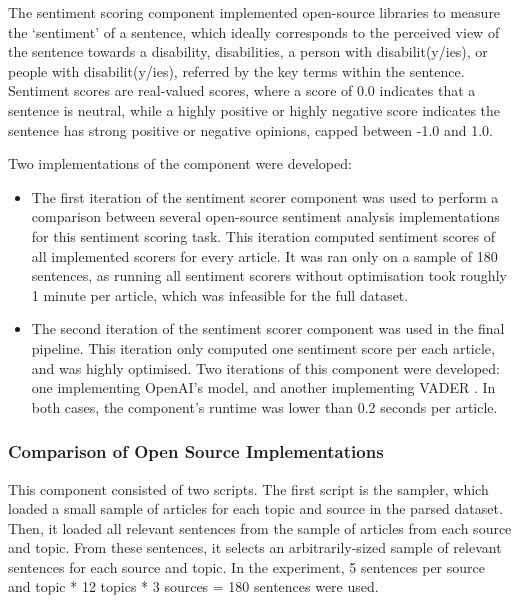 \documentclass{report}
\newcommand{\textapprox}{\raisebox{0.5ex}{\texttildelow}}  %
\begin{document}
The sentiment scoring component implemented open-source libraries to measure the `sentiment' of a sentence, which ideally corresponds to the perceived view of the sentence towards a disability, disabilities, a person with disabilit(y/ies), or people with disabilit(y/ies), referred by the key terms within the sentence.
Sentiment scores are real-valued scores, where a score of 0.0 indicates that a sentence is neutral, while a highly positive or highly negative score indicates the sentence has strong positive or negative opinions, capped between -1.0 and 1.0.

Two implementations of the component were developed: 
\begin{itemize}
	\item The first iteration of the sentiment scorer component was used to perform a comparison between several open-source sentiment analysis implementations for this sentiment scoring task.
		This iteration computed sentiment scores of all implemented scorers for every article. 
		It was ran only on a sample of 180 sentences, as running all sentiment scorers without optimisation took roughly \textapprox1 minute per article, which was infeasible for the full dataset.
	\item The second iteration of the sentiment scorer component was used in the final pipeline.
		This iteration only computed one sentiment score per each article, and was highly optimised.
		Two iterations of this component were developed: one implementing OpenAI's \cite{OpenAI} model, and another implementing VADER \cite{VADER}.
		In both cases, the component's runtime was lower than 0.2 seconds per article.
\end{itemize}

\subsubsection{Comparison of Open Source Implementations} \label{des-sentiment-comparison}

This component consisted of two scripts.
The first script is the sampler, which loaded a small sample of articles for each topic and source in the parsed dataset.
Then, it loaded all relevant sentences from the sample of articles from each source and topic.
From these sentences, it selects an arbitrarily-sized sample of relevant sentences for each source and topic.
In the experiment, 5 sentences per source and topic * 12 topics * 3 sources = 180 sentences were used.
\end{document}
